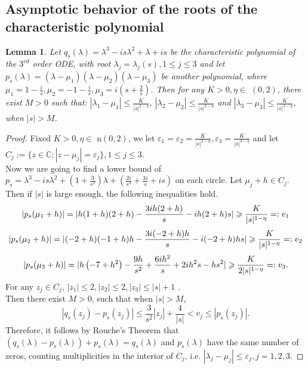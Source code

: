 \documentclass[a4paper,draft]{amsproc}
\theoremstyle{plain}
\newtheorem{lem}{Lemma}[section]
\theoremstyle{definition}
\theoremstyle{remark}
\numberwithin{equation}{section}
\begin{document}
\subsection{Asymptotic behavior of the roots of the characteristic polynomial}
\begin{lem} \label{key_lemma}
Let $q_s(\lambda)= \lambda^3-is\lambda^2+\lambda+is$ be the characteristic polynomial of the $3^{rd}$ order ODE, with root ${\lambda_j=\lambda_j(s)},1\leq j\leq 3$ and let $p_s(\lambda)= (\lambda-\mu_1)(\lambda-\mu_2)(\lambda-\mu_3)$ be another polynomial, where $\mu_1=1-\frac{i}{s},\mu_2=-1-\frac{i}{s}, \mu_3=i(s+\frac{2}{s})$. 
Then for any $ K>0, \eta \in$ $(0,2)$, there exist $M>0$ such that:  
$|\lambda_1-\mu_1|\leq \frac{K}{|s|^{2-\eta}}$, 
$|\lambda_2-\mu_2|\leq \frac{K}{|s|^{2-\eta}}$ and $|
\lambda_3-\mu_3|\leq \frac{K}{|s|^{3-\eta}}$, when $ |s|>M$.
\end{lem}
\begin{proof}
Fixed  $K>0, \eta \in$  n$(0,2)$, we let $\varepsilon_1=\varepsilon_2=\frac{K}{|s|^{2-\eta}},\varepsilon_3=\frac{K}{|s|^{3-\eta}}$ and let $C_j:=\{z\in\mathbb{C} :|z-\mu_j|=\varepsilon_j\},1\leq j\leq 3$. \\
Now we are going to find a lower bound of $p_s=\lambda ^3-i s \lambda ^2+\left(1+\frac{3}{s^2}\right) \lambda+(\frac{2 i}{s^3}+\frac{3 i}{s}+i s )$ on each circle. Let $\mu_j+h\in C_j$. Then if $|s|$ is large enough, the following inequalities hold.
\begin{displaymath}
|p_s(\mu_1+h)|=|{h (1+h) (2+h)-\frac{3 i h (2+h)}{s}-i h (2+h) s}|\geq \dfrac{K}{|s|^{1-\eta}}=:v_1\\
\end{displaymath}
\begin{displaymath}
|p_s(\mu_2+h)|=|{(-2+h) (-1+h) h-\frac{3 i (-2+h) h}{s}-i (-2+h) h s}|\geq \dfrac{K}{|s|^{1-\eta}}=:v_2\\
\end{displaymath}
\begin{displaymath}
|p_s(\mu_3+h)|=|{h \left(-7+h^2\right)-\frac{9 h}{s^2}+\frac{6 i h^2}{s}+2 i h^2 s-h s^2}|\geq \dfrac{K}{2|s|^{1-\eta}}=:v_3.\\
\end{displaymath}
For any $z_j\in C_j$,  $|z_1|\leq 2,|z_2|\leq 2,|z_3|\leq |s|+1$ .\\
Then there exist $M>0$, such that when $|s|>M$, 
\begin{displaymath}
|q_s(z_j)-p_s(z_j)|\leq\dfrac{3}{s^2}|z_j|+\dfrac{4}{|s|}<v_j\leq |p_s(z_j)|.
\end{displaymath}
Therefore, it follows by Rouche’s Theorem that $(q_s(\lambda)-p_s(\lambda))+p_s(\lambda)=q_s(\lambda)$ and  $p_s(\lambda)$ have the same number of zeros, counting multiplicities in the interior of $C_j$, i.e.  $|
\lambda_j-\mu_j|\leq \varepsilon_j,j=1,2,3$.
\end{proof}
\end{document}
